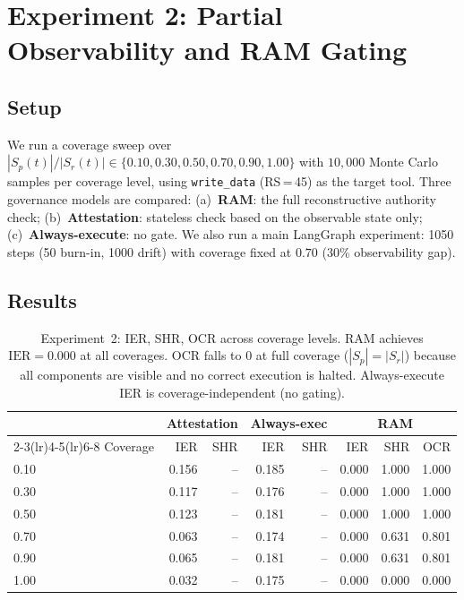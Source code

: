 \documentclass[11pt]{article}
\newcommand{\IER}{\mathrm{IER}}
\begin{document}
\section{Experiment 2: Partial Observability and RAM Gating}
\label{sec:exp2}

\subsection{Setup}

We run a coverage sweep over $|S_p(t)| / |S_r(t)| \in \{0.10, 0.30, 0.50,
0.70, 0.90, 1.00\}$ with $10{,}000$ Monte Carlo samples per coverage level,
using \texttt{write\_data} (RS\,=\,45) as the target tool.
Three governance models are compared:
(a)~\textbf{RAM}: the full reconstructive authority check;
(b)~\textbf{Attestation}: stateless check based on the observable state only;
(c)~\textbf{Always-execute}: no gate.
We also run a main LangGraph experiment: 1050 steps (50 burn-in, 1000 drift)
with coverage fixed at $0.70$ (30\% observability gap).

\subsection{Results}

\begin{table}[h]
\centering
\small
\begin{tabular}{@{}lrrrrrrr@{}}
\toprule
 & \multicolumn{2}{c}{Attestation} & \multicolumn{2}{c}{Always-exec} &
   \multicolumn{3}{c}{RAM} \\
\cmidrule(lr){2-3}\cmidrule(lr){4-5}\cmidrule(lr){6-8}
Coverage & IER & SHR & IER & SHR & IER & SHR & OCR \\
\midrule
0.10 & 0.156 & -- & 0.185 & -- & 0.000 & 1.000 & 1.000 \\
0.30 & 0.117 & -- & 0.176 & -- & 0.000 & 1.000 & 1.000 \\
0.50 & 0.123 & -- & 0.181 & -- & 0.000 & 1.000 & 1.000 \\
0.70 & 0.063 & -- & 0.174 & -- & 0.000 & 0.631 & 0.801 \\
0.90 & 0.065 & -- & 0.181 & -- & 0.000 & 0.631 & 0.801 \\
1.00 & 0.032 & -- & 0.175 & -- & 0.000 & 0.000 & 0.000 \\
\bottomrule
\end{tabular}
\caption{Experiment~2: IER, SHR, OCR across coverage levels.
RAM achieves $\IER = 0.000$ at all coverages.
OCR falls to 0 at full coverage ($|S_p|=|S_r|$) because all components
are visible and no correct execution is halted.
Always-execute IER is coverage-independent (no gating).}
\label{tab:exp2}
\end{table}
\end{document}
